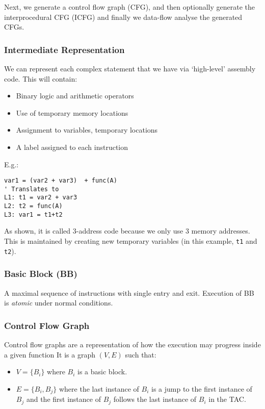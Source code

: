 \documentclass[11pt,a4paper,titlepage,dvipsnames,cmyk]{scrartcl}
\begin{document}
Next, we generate a control flow graph (CFG), and then optionally generate the interprocedural CFG (ICFG) and finally we data-flow analyse the generated CFGs.

\subsubsection{Intermediate Representation}
We can represent each complex statement that we have via `high-level' assembly code. This will contain:
\begin{itemize}
    \item Binary logic and arithmetic operators
    \item Use of temporary memory locations
    \item Assignment to variables, temporary locations
    \item A label assigned to each instruction
\end{itemize}

E.g.:
\begin{lstlisting}
var1 = (var2 + var3)  + func(A)
' Translates to
L1: t1 = var2 + var3
L2: t2 = func(A)
L3: var1 = t1+t2
\end{lstlisting}

As shown, it is called 3-address code because we only use 3 memory addresses. This is maintained by creating new temporary variables (in this example, \texttt{t1} and \texttt{t2}).


\subsubsection{Basic Block (BB)}
A maximal sequence of instructions with single entry and exit. Execution of BB is \textit{atomic} under normal conditions.

\subsubsection{Control Flow Graph}
Control flow graphs are a representation of how the execution may progress inside a given function It is a graph $(V,E)$ such that:
\begin{itemize}
    \item $V = \{B_i\}$ where $B_i$ is a basic block.
    \item $E = \{B_i,B_j\}$ where the last instance of $B_i$ is a jump to the first instance of $B_j$ and the first instance of $B_j$ follows the last instance of $B_i$ in the TAC.
\end{itemize}
\end{document}
